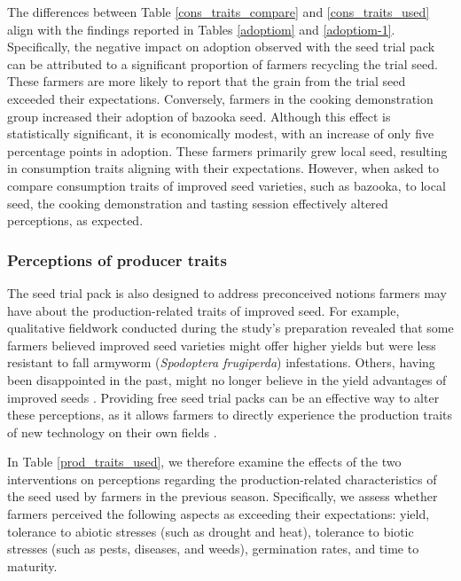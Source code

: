 \documentclass[english]{article}\usepackage[]{graphicx}\usepackage[]{xcolor}
\begin{document}
The differences between Table \ref{cons_traits_compare} and \ref{cons_traits_used}
align with the findings reported in Tables \ref{adoptiom} and \ref{adoptiom-1}.
Specifically, the negative impact on adoption observed with the seed
trial pack can be attributed to a significant proportion of farmers
recycling the trial seed. These farmers are more likely to report
that the grain from the trial seed exceeded their expectations. Conversely,
farmers in the cooking demonstration group increased their adoption
of bazooka seed. Although this effect is statistically significant,
it is economically modest, with an increase of only five percentage
points in adoption. These farmers primarily grew local seed, resulting
in consumption traits aligning with their expectations. However, when
asked to compare consumption traits of improved seed varieties, such
as bazooka, to local seed, the cooking demonstration and tasting session
effectively altered perceptions, as expected.

\subsubsection{Perceptions of producer traits}

The seed trial pack is also designed to address preconceived notions
farmers may have about the production-related traits of improved seed.
For example, qualitative fieldwork conducted during the study’s preparation
revealed that some farmers believed improved seed varieties might
offer higher yields but were less resistant to fall armyworm (\emph{Spodoptera
frugiperda}) infestations. Others, having been disappointed in the
past, might no longer believe in the yield advantages of improved
seeds \citep{miehe2023miracle}. Providing free seed trial packs can
be an effective way to alter these perceptions, as it allows farmers
to directly experience the production traits of new technology on
their own fields \citep{doi:10.1086/601447}.

In Table \ref{prod_traits_used}, we therefore examine the effects
of the two interventions on perceptions regarding the production-related
characteristics of the seed used by farmers in the previous season.
Specifically, we assess whether farmers perceived the following aspects
as exceeding their expectations: yield, tolerance to abiotic stresses
(such as drought and heat), tolerance to biotic stresses (such as
pests, diseases, and weeds), germination rates, and time to maturity.
\end{document}

